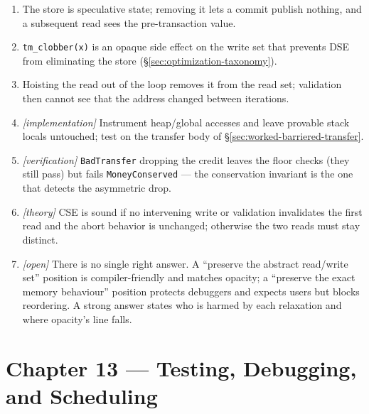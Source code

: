 \begin{enumerate}
    \item The store is speculative state; removing it lets a commit publish
          nothing, and a subsequent read sees the pre-transaction value.
    \item \texttt{tm\_clobber(x)} is an opaque side effect on the write set
          that prevents DSE from eliminating the store
          (\S\ref{sec:optimization-taxonomy}).
    \item Hoisting the read out of the loop removes it from the read set;
          validation then cannot see that the address changed between
          iterations.
    \item \emph{[implementation]} Instrument heap/global accesses and leave
          provable stack locals untouched; test on the transfer body of
          \S\ref{sec:worked-barriered-transfer}.
    \item \emph{[verification]} \texttt{BadTransfer} dropping the credit
          leaves the floor checks (they still pass) but fails
          \texttt{MoneyConserved} --- the conservation invariant is the one
          that detects the asymmetric drop.
    \item \emph{[theory]} CSE is sound if no intervening write or
          validation invalidates the first read and the abort behavior is
          unchanged; otherwise the two reads must stay distinct.
    \item \emph{[open]} There is no single right answer.  A ``preserve the
          abstract read/write set'' position is compiler-friendly and
          matches opacity; a ``preserve the exact memory behaviour''
          position protects debuggers and expects users but blocks
          reordering.  A strong answer states who is harmed by each
          relaxation and where opacity's line falls.
\end{enumerate}

\section*{Chapter 13 --- Testing, Debugging, and Scheduling}

